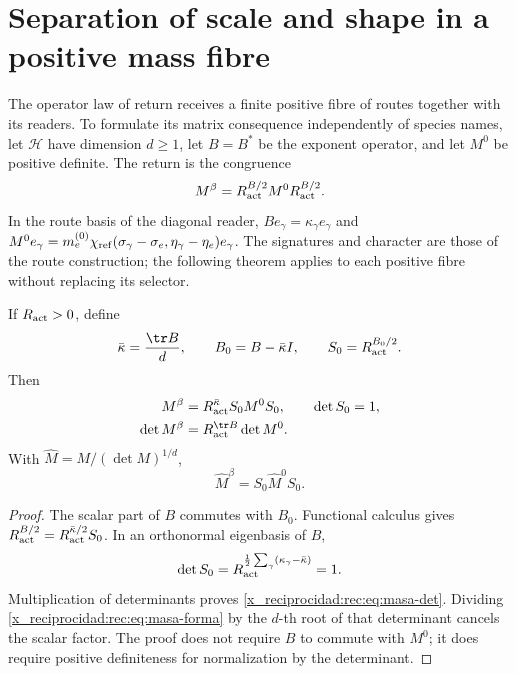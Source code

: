 \section{Separation of scale and shape in a positive mass fibre}

The operator law of return receives a finite positive fibre of routes together with its readers. To formulate its matrix consequence independently of species names, let \(\mathcal H\) have dimension \(d\ge1\), let \(B=B^*\) be the exponent operator, and let \(M^0\) be positive definite. The return is the congruence
\begin{equation}
 M^\beta=R_{\rm act}^{B/2}M^0R_{\rm act}^{B/2}.
 \label{x_reciprocidad:rec:eq:masa-operador}
\end{equation}
In the route basis of the diagonal reader, \(Be_\gamma=\kappa_\gamma e_\gamma\) and
\(M^0e_\gamma=m_e^{(0)}\chi_{\rm ref}(\sigma_\gamma-\sigma_e,\eta_\gamma-\eta_e)e_\gamma\). The signatures and character are those of the route construction; the following theorem applies to each positive fibre without replacing its selector.

\begin{theorem}
\label{x_reciprocidad:rec:thm:masa}
If \(R_{\rm act}>0\), define
\[
 \bar\kappa=\frac{\tr B}{d},\qquad B_0=B-\bar\kappa I,
 \qquad S_0=R_{\rm act}^{B_0/2}.
\]
Then
\begin{align}
 M^\beta&=R_{\rm act}^{\bar\kappa}S_0M^0S_0,
 \qquad\det S_0=1,\label{x_reciprocidad:rec:eq:masa-forma}\\
 \det M^\beta&=R_{\rm act}^{\tr B}\det M^0.\label{x_reciprocidad:rec:eq:masa-det}
\end{align}
With \(\widehat M=M/(\det M)^{1/d}\),
\begin{equation}
 \widehat M^\beta=S_0\widehat M^0S_0.
 \label{x_reciprocidad:rec:eq:masa-normalizada}
\end{equation}
\end{theorem}
\begin{proof}
The scalar part of \(B\) commutes with \(B_0\). Functional calculus gives
\(R_{\rm act}^{B/2}=R_{\rm act}^{\bar\kappa/2}S_0\). In an orthonormal eigenbasis of \(B\),
\[
 \det S_0=R_{\rm act}^{\frac12\sum_\gamma(\kappa_\gamma-\bar\kappa)}=1.
\]
Multiplication of determinants proves \eqref{x_reciprocidad:rec:eq:masa-det}. Dividing \eqref{x_reciprocidad:rec:eq:masa-forma} by the \(d\)-th root of that determinant cancels the scalar factor. The proof does not require \(B\) to commute with \(M^0\); it does require positive definiteness for normalization by the determinant.
\end{proof}

